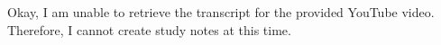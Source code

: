 \documentclass[11pt,a4paper]{article}
\begin{document}
Okay, I am unable to retrieve the transcript for the provided YouTube video. Therefore, I cannot create study notes at this time.
\end{document}
